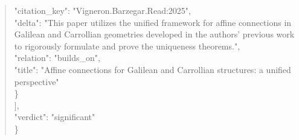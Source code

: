 \documentclass[11pt]{article}
\begin{document}
\begin{quote}
      "citation\_key": "Vigneron.Barzegar.Read:2025",\\
      "delta": "This paper utilizes the unified framework for affine connections in Galilean and Carrollian geometries developed in the authors' previous work to rigorously formulate and prove the uniqueness theorems.",\\
      "relation": "builds\_on",\\
      "title": "Affine connections for Galilean and Carrollian structures: a unified perspective"\\
    \}\\
  ],\\
  "verdict": "significant"\\
\}\\
\end{quote}
\end{document}
